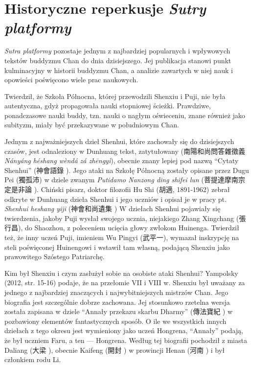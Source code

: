 \chapter{Historyczne reperkusje \textit{Sutry platformy}}
\textit{Sutra platformy} pozostaje jednym z najbardziej popularnych i wpływowych tekstów buddyzmu Chan do dnia dzisiejszego. Jej publikacja stanowi punkt kulminacyjny w historii buddyzmu Chan, a analizie zawartych w niej nauk i opowieści poświęcono wiele prac naukowych.

Twierdził, że Szkoła Północna, której przewodzili Shenxiu i Puji, nie była autentyczna, gdyż propagowała nauki stopniowej ścieżki. Prawdziwe, ponadczasowe nauki buddy, tzn. nauki o nagłym oświeceniu, znane również jako subityzm, miały być przekazywane w południowym Chan.

Jednym z najważniejszych dzieł Shenhui, które zachowały się do dzisiejszych czasów, jest odnaleziony w Dunhuang tekst, zatytułowany  (南陽和尚問答雜徵義 \textit{Nányáng héshang wèndá zá zhēngyì}), obecnie znany lepiej pod nazwą ``Cytaty Shenhui'' (神會語錄 ).
Jego ataki na Szkołę Północną zostały opisane przez Dugu Pei (獨孤沛) w dziele zwanym \textit{Putidamo Nanzong ding shifei lun} (菩提達摩南宗定是非論 ).
Chiński pisarz, doktor filozofii Hu Shi (胡適, 1891-1962) zebrał odkryte w Dunhuang dzieła Shenhui i jego uczniów i opisał je w pracy pt. \textit{Shenhui heshang yiji} (神會和尚遺集 )
W dziełach Shenhui pojawiały się twierdzenia, jakoby Puji wysłał swojego ucznia, niejakiego Zhang Xingchang (張行昌), do Shaozhou, z poleceniem ucięcia głowy zwłokom Huinenga.
Twierdził też, że inny uczeń Puji, imieniem Wu Pingyi (武平一), wymazał inskrypcję na steli poświęconej Huinengowi i wstawił tam własną, podającą Shenxiu jako prawowitego Szóstego Patriarchę.

Kim był Shenxiu i czym zasłużył sobie na osobiste ataki Shenhui? Yampolsky (2012, str. 15-16) podaje, że na przełomie VII i VIII w. Shenxiu był uważany za jednego z najbardziej znaczących i najwybitniejszych mistrzów Chan.
Jego biografia jest szczególnie dobrze zachowana. Jej stosunkowo rzetelna wersja została zapisana w dziele ``Annały przekazu skarbu Dharmy'' (傳法寶紀 ) w pozbawiony elementów fantastycznych sposób.
O ile we wszystkich innych dziełach z tego okresu jest wymieniony jako uczeń Hongrena, ``Annały'' podają, że był uczniem Faru, a ten --- Hongrena. Według tej biografii pochodził z miasta Daliang (大梁 ), obecnie Kaifeng (開封 ) w prowincji Henan (河南 ) i był członkiem rodu Li.

